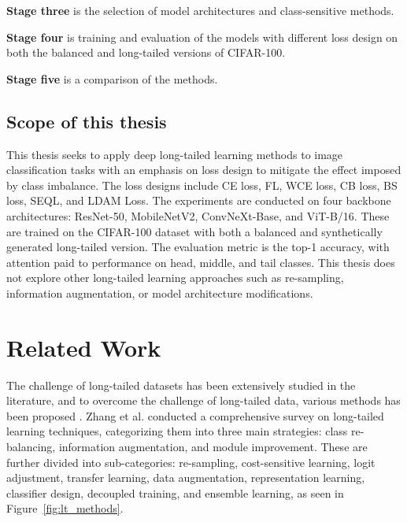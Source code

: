 \noindent \textbf{Stage three} is the selection of model architectures and class-sensitive methods.
\vspace{1em}

\noindent \textbf{Stage four} is training and evaluation of the models with different loss design on both the balanced and long-tailed versions of CIFAR-100.
\vspace{1em}

\noindent \textbf{Stage five} is a comparison of the methods.
\vspace{1em}



\subsection{Scope of this thesis}
This thesis seeks to apply deep long-tailed learning methods to image classification tasks with an emphasis on loss design to mitigate the effect imposed by class imbalance. The loss designs include CE loss, FL, WCE loss, CB loss, BS loss, SEQL, and LDAM Loss. The experiments are conducted on four backbone architectures: ResNet-50, MobileNetV2, ConvNeXt-Base, and ViT-B/16. These are trained on the CIFAR-100 dataset with both a balanced and synthetically generated long-tailed version. The evaluation metric is the top-1 accuracy, with attention paid to performance on head, middle, and tail classes. This thesis does not explore other long-tailed learning approaches such as re-sampling, information augmentation, or model architecture modifications.




\section{Related Work}
The challenge of long-tailed datasets has been extensively studied in the literature, and to overcome the challenge of long-tailed data, various methods has been proposed \cite{zhang2023deep,zhang2024systematicreviewlongtailedlearning}. Zhang et al. \cite{zhang2023deep} conducted a comprehensive survey on long-tailed learning techniques, categorizing them into three main strategies: class re-balancing, information augmentation, and module improvement. These are further divided into sub-categories: re-sampling, cost-sensitive learning, logit adjustment, transfer learning, data augmentation, representation learning, classifier design, decoupled training, and ensemble learning, as seen in Figure~\ref{fig:lt_methods}. 

